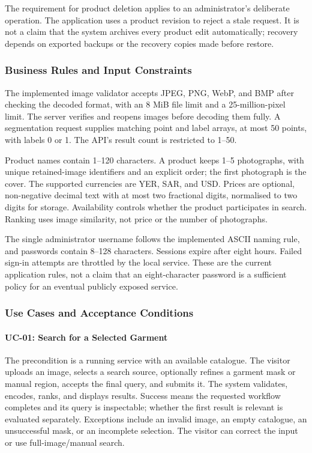 The requirement for product deletion applies to an administrator's deliberate
operation. The application uses a product revision to reject a stale request.
It is not a claim that the system archives every product edit automatically;
recovery depends on exported backups or the recovery copies made before restore.
\subsubsection{Business Rules and Input Constraints}
The implemented image validator accepts JPEG, PNG, WebP, and BMP after checking
the decoded format, with an 8 MiB file limit and a 25-million-pixel limit. The
server verifies and reopens images before decoding them fully. A segmentation
request supplies matching point and label arrays, at most 50 points, with labels
0 or 1. The API's result count is restricted to 1--50.

Product names contain 1--120 characters. A product keeps 1--5 photographs, with
unique retained-image identifiers and an explicit order; the first photograph
is the cover. The supported currencies are YER, SAR, and USD. Prices are optional,
non-negative decimal text with at most two fractional digits, normalised to two
digits for storage. Availability controls whether the product participates in
search. Ranking uses image similarity, not price or the number of photographs.

The single administrator username follows the implemented ASCII naming rule,
and passwords contain 8--128 characters. Sessions expire after eight hours.
Failed sign-in attempts are throttled by the local service. These are the
current application rules, not a claim that an eight-character password is a
sufficient policy for an eventual publicly exposed service.

\subsubsection{Use Cases and Acceptance Conditions}
\paragraph{UC-01: Search for a Selected Garment}
The precondition is a running service with an available catalogue. The visitor
uploads an image, selects a search source, optionally refines a garment mask or
manual region, accepts the final query, and submits it. The system validates,
encodes, ranks, and displays results. Success means the requested workflow
completes and its query is inspectable; whether the first result is relevant
is evaluated separately. Exceptions include an invalid image, an empty catalogue,
an unsuccessful mask, or an incomplete selection. The visitor can correct the
input or use full-image/manual search.

